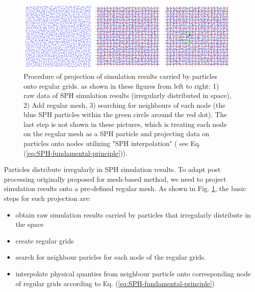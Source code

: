 
\label{app:project-SPH-grid}    %
\begin{figure}[!htb]
    \centering
	\includegraphics[width=14cm]{Appendix-A/Figures/FigA1.png} 
    \caption{Procedure of projection of simulation results carried by particles onto regular grids. as shown in these figures from left to right: 1) raw data of SPH simulation results (irregularly distributed in space), 2) Add regular mesh, 3) searching for neighbours of each node (the blue SPH particles within the green circle around the red dot). The last step is not shown in these pictures, which is treating each node on the regular mesh as a SPH particle and projecting data on particles onto nodes utilizing "SPH interpolation" ( see Eq. (\ref{eq:SPH-fundamental-principle})).}
    \label{appfig:1D-shock-tests-verification}
\end{figure}

Particles distribute irregularly in SPH simulation results. To adapt post processing originally proposed for mesh-based method, we need to project simulation results onto a pre-defined regular mesh. As shown in Fig. \ref{appfig:1D-shock-tests-verification}, the basic steps for such projection are:
\begin{itemize}
\item obtain raw simulation results carried by particles that irregularly distribute in the space
\item create regular grids
\item search for neighbour paricles for each node of the regular grids.
\item interpolate physical quanties from neighbour particle onto corresponding node of regular grids according to Eq. (\ref{eq:SPH-fundamental-principle})
\end{itemize}
